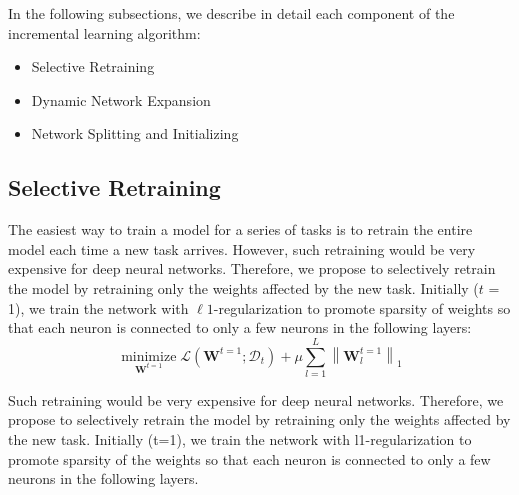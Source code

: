 In the following subsections, we describe in detail each component of the incremental learning algorithm: 
\begin{itemize}
	\item Selective Retraining
	\item Dynamic Network Expansion
	\item Network Splitting and Initializing
\end{itemize}

\subsection{Selective Retraining}
The easiest way to train a model for a series of tasks is to retrain the entire model each time a new task arrives. However, such retraining would be very expensive for deep neural networks. Therefore, we propose to selectively retrain the model by retraining only the weights affected by the new task. Initially ($t$ = 1), we train the network with $\ell 1$-regularization to promote sparsity of weights so that each neuron is connected to only a few neurons in the following layers:
$$
\underset{\boldsymbol{W}^{t=1}}{\operatorname{minimize}} \mathcal{L}\left(\boldsymbol{W}^{t=1} ; \mathcal{D}_{t}\right)+\mu \sum_{l=1}^{L}\left\|\boldsymbol{W}_{l}^{t=1}\right\|_{1}
\label{eq:2}
$$

Such retraining would be very expensive for deep neural networks. Therefore, we propose to selectively retrain the model by retraining only the weights affected by the new task. Initially (t=1), we train the network with l1-regularization to promote sparsity of the weights so that each neuron is connected to only a few neurons in the following layers.


